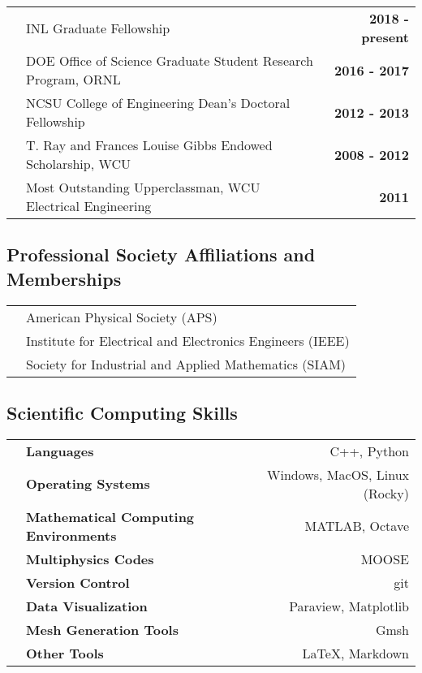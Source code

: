 \documentclass{article}
\begin{document}
	\begin{tabularx}{\textwidth}{l X r}
		\hspace{2em} & INL Graduate Fellowship & \textbf{2018 - present} \\
					       & DOE Office of Science Graduate Student Research Program, ORNL & \textbf{2016 - 2017} \\
					       & NCSU College of Engineering Dean's Doctoral Fellowship & \textbf{2012 - 2013} \\
					       & T. Ray and Frances Louise Gibbs Endowed Scholarship, WCU & \textbf{2008 - 2012} \\
					       & Most Outstanding Upperclassman, WCU Electrical Engineering & \textbf{2011}
	\end{tabularx}

\subsection*{Professional Society Affiliations and Memberships}

\begin{tabularx}{\textwidth}{l l}
	\hspace{2em} & American Physical Society (APS) \\
				 & Institute for Electrical and Electronics Engineers (IEEE) \\
				 & Society for Industrial and Applied Mathematics (SIAM)
\end{tabularx}

\subsection*{Scientific Computing Skills}

	\begin{tabularx}{\textwidth}{l X r}
		\hspace {2em} & \textbf{Languages} & C++, Python \\
					        & \textbf{Operating Systems} & Windows, MacOS, Linux (Rocky) \\
					        & \textbf{Mathematical Computing Environments} & MATLAB, Octave \\
					        & \textbf{Multiphysics Codes} & MOOSE \\
					        & \textbf{Version Control} & git \\
					        & \textbf{Data Visualization} & Paraview, Matplotlib \\
					        & \textbf{Mesh Generation Tools} & Gmsh \\
					        & \textbf{Other Tools} & \LaTeX, Markdown \\
	\end{tabularx}
\end{document}
